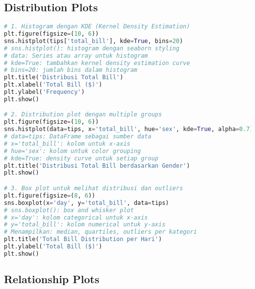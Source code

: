 \subsection*{Distribution Plots}

\begin{lstlisting}[language=python, caption={Histogram dan Density Plots}, style=python]
# 1. Histogram dengan KDE (Kernel Density Estimation)
plt.figure(figsize=(10, 6))
sns.histplot(tips['total_bill'], kde=True, bins=20)
# sns.histplot(): histogram dengan seaborn styling
# data: Series atau array untuk histogram
# kde=True: tambahkan kernel density estimation curve
# bins=20: jumlah bins dalam histogram
plt.title('Distribusi Total Bill')
plt.xlabel('Total Bill ($)')
plt.ylabel('Frequency')
plt.show()

# 2. Distribution plot dengan multiple groups
plt.figure(figsize=(10, 6))
sns.histplot(data=tips, x='total_bill', hue='sex', kde=True, alpha=0.7)
# data=tips: DataFrame sebagai sumber data
# x='total_bill': kolom untuk x-axis
# hue='sex': kolom untuk color grouping
# kde=True: density curve untuk setiap group
plt.title('Distribusi Total Bill berdasarkan Gender')
plt.show()

# 3. Box plot untuk melihat distribusi dan outliers
plt.figure(figsize=(8, 6))
sns.boxplot(x='day', y='total_bill', data=tips)
# sns.boxplot(): box and whisker plot
# x='day': kolom categorical untuk x-axis
# y='total_bill': kolom numerical untuk y-axis
# Menampilkan: median, quartiles, outliers per kategori
plt.title('Total Bill Distribution per Hari')
plt.ylabel('Total Bill ($)')
plt.show()
\end{lstlisting}

\subsection*{Relationship Plots}

